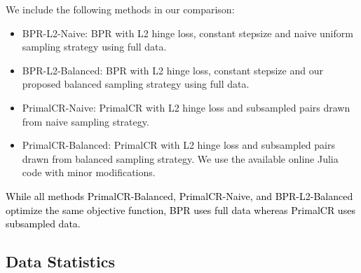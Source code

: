 \documentclass[conference]{IEEEtran}
\numberwithin{equation}{section}
\newcommand{\laks}[1]{\textcolor{black}{#1}}
\newtheorem{sampling strategy}{Sampling Strategy}
\begin{document}
We include the following methods in our comparison:

\begin{itemize}
    \item \textsf{BPR-L2-Naive}: BPR with L2 hinge loss, constant stepsize and naive uniform sampling strategy using full data.
    \item \textsf{BPR-L2-Balanced}: BPR with L2 hinge loss, constant stepsize and our proposed balanced sampling strategy using full data.
    \item \textsf{PrimalCR-Naive}: PrimalCR with L2 hinge loss and subsampled pairs drawn from naive sampling strategy. 
    \item \textsf{PrimalCR-Balanced}: PrimalCR with L2 hinge loss and subsampled pairs drawn from balanced sampling strategy. We use the  available online Julia code with minor modifications. %
    
\end{itemize}
\laks{While all methods \textsf{PrimalCR-Balanced},  \textsf{PrimalCR-Naive}, and  \textsf{BPR-L2-Balanced}  optimize  the same objective function, \textsf{BPR} uses full data whereas \textsf{PrimalCR} uses subsampled data.} 



\subsection{Data Statistics}
\end{document}
